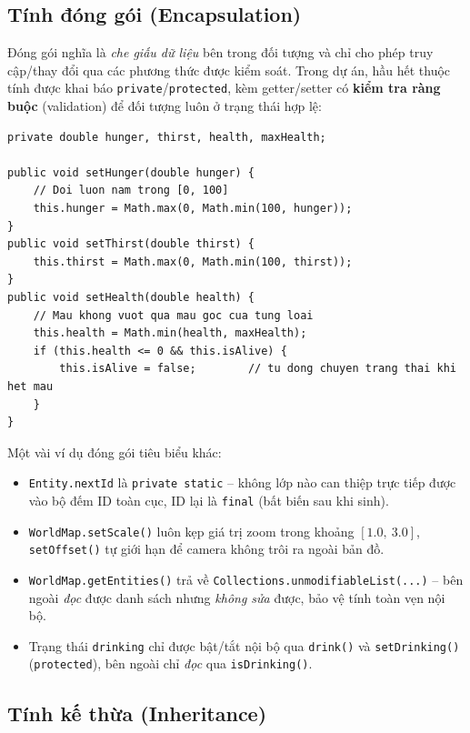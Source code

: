 \documentclass[12pt,a4paper]{report}
\newcommand{\keyword}[1]{\textcolor{primaryblue}{\textbf{#1}}}
\newcommand{\code}[1]{\texttt{\small #1}}
\begin{document}
\subsection{Tính đóng gói (Encapsulation)}

Đóng gói nghĩa là \textit{che giấu dữ liệu} bên trong đối tượng và chỉ cho phép truy cập/thay đổi qua các phương thức được kiểm soát. Trong dự án, hầu hết thuộc tính được khai báo \code{private}/\code{protected}, kèm getter/setter có \keyword{kiểm tra ràng buộc} (validation) để đối tượng luôn ở trạng thái hợp lệ:

\begin{lstlisting}[caption={Setter có ràng buộc trong LivingEntity}]
private double hunger, thirst, health, maxHealth;

public void setHunger(double hunger) {
    // Doi luon nam trong [0, 100]
    this.hunger = Math.max(0, Math.min(100, hunger));
}
public void setThirst(double thirst) {
    this.thirst = Math.max(0, Math.min(100, thirst));
}
public void setHealth(double health) {
    // Mau khong vuot qua mau goc cua tung loai
    this.health = Math.min(health, maxHealth);
    if (this.health <= 0 && this.isAlive) {
        this.isAlive = false;        // tu dong chuyen trang thai khi het mau
    }
}
\end{lstlisting}

Một vài ví dụ đóng gói tiêu biểu khác:

\begin{itemize}[leftmargin=1.5em]
    \item \code{Entity.nextId} là \code{private static} -- không lớp nào can thiệp trực tiếp được vào bộ đếm ID toàn cục, ID lại là \code{final} (bất biến sau khi sinh).
    \item \code{WorldMap.setScale()} luôn kẹp giá trị zoom trong khoảng $[1.0,\ 3.0]$, \code{setOffset()} tự giới hạn để camera không trôi ra ngoài bản đồ.
    \item \code{WorldMap.getEntities()} trả về \code{Collections.unmodifiableList(...)} -- bên ngoài \emph{đọc} được danh sách nhưng \emph{không sửa} được, bảo vệ tính toàn vẹn nội bộ.
    \item Trạng thái \code{drinking} chỉ được bật/tắt nội bộ qua \code{drink()} và \code{setDrinking()} (\code{protected}), bên ngoài chỉ \emph{đọc} qua \code{isDrinking()}.
\end{itemize}

\subsection{Tính kế thừa (Inheritance)}
\end{document}
